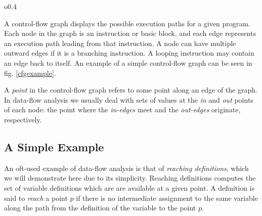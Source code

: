 \documentclass[bsc,twoside,singlespacing,parskip,logo]{infthesis}     %
\begin{document}
        \begin{wrapfigure}[15]{o}{0.4\textwidth}
        \centering
        \caption{A control-flow graph.}
        \label{cfgexample}
        \end{wrapfigure}        

        A control-flow graph displays the possible execution paths for a given program. Each node in the graph is an instruction or basic block, and each edge represents an execution path leading from that instruction. A node can have multiple outward edges if it is a branching instruction. A looping instruction may contain an edge back to itself. An example of a simple control-flow graph can be seen in fig. \ref{cfgexample}.
        
        A {\em point} in the control-flow graph refers to some point along an edge of the graph. In data-flow analysis we usually deal with sets of values at the {\em in} and {\em out} points of each node: the point where the {\em in-edges} meet and the {\em out-edges} originate, respectively.

		\subsection{A Simple Example}
		An oft-used example of data-flow analysis is that of {\em reaching definitions}, which we will demonstrate here due to its simplicity. Reaching definitions computes the set of variable definitions which are are available at a given point. A definition is said to {\em reach} a point $p$ if there is no intermediate assignment to the same variable along the path from the definition of the variable to the point $p$.
        
\end{document}
